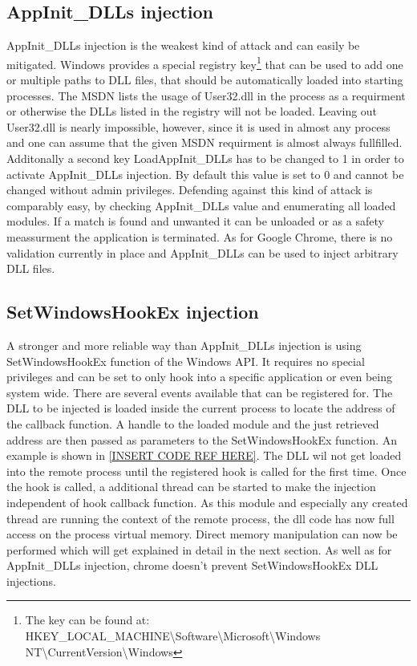 \subsection{AppInit\_DLLs injection}
AppInit\_DLLs injection is the weakest kind of attack and can easily be mitigated. Windows provides a special registry key\footnote{The key can be found at: HKEY\_LOCAL\_MACHINE\textbackslash Software\textbackslash Microsoft\textbackslash Windows NT\textbackslash CurrentVersion\textbackslash Windows} that can be used to add one or multiple paths to DLL files, that should be automatically loaded into starting processes. The MSDN\cite{msdn_appinitdlls} lists the usage of User32.dll in the process as a requirment or otherwise the DLLs listed in the registry will not be loaded. Leaving out User32.dll is nearly impossible, however, since it is used in almost any process and one can assume that the given MSDN requirment is almost always fullfilled. Additonally a second key LoadAppInit\_DLLs has to be changed to 1 in order to activate AppInit\_DLLs injection. By default this value is set to 0 and cannot be changed without admin privileges. Defending against this kind of attack is comparably easy, by checking AppInit\_DLLs value and enumerating all loaded modules. If a match is found and unwanted it can be unloaded or as a safety meassurment the application is terminated. As for Google Chrome, there is no validation currently in place and AppInit\_DLLs can be used to inject arbitrary DLL files.

\subsection{SetWindowsHookEx injection}
A stronger and more reliable way than AppInit\_DLLs injection is using SetWindowsHookEx function of the Windows API. It requires no special privileges and can be set to only hook into a specific application or even being system wide. There are several events available that can be registered for. The DLL to be injected is loaded inside the current process to locate the address of the callback function. A handle to the loaded module and the just retrieved address are then passed as parameters to the SetWindowsHookEx function. An example is shown in \ref{INSERT CODE REF HERE}. The DLL wil not get loaded into the remote process until the registered hook is called for the first time. Once the hook is called, a additional thread can be started to make the injection independent of hook callback function. As this module and especially any created thread are running the context of the remote process, the dll code has now full access on the process virtual memory. Direct memory manipulation can now be performed which will get explained in detail in the next section. As well as for AppInit\_DLLs injection, chrome doesn't prevent SetWindowsHookEx DLL injections.

